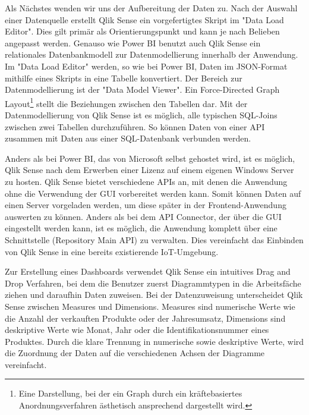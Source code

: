 Als Nächstes wenden wir uns der Aufbereitung der Daten zu. Nach der Auswahl einer Datenquelle
erstellt Qlik Sense ein vorgefertigtes Skript im "Data Load Editor". Dies gilt primär als Orientierungspunkt
und kann je nach Belieben angepasst werden. Genauso wie Power BI benutzt auch Qlik Sense ein relationales
Datenbankmodell zur Datenmodellierung innerhalb der Anwendung. Im "Data Load Editor"
werden, so wie bei Power BI, Daten im JSON-Format mithilfe eines Skripts in eine Tabelle konvertiert.
Der Bereich zur Datenmodellierung ist der "Data Model Viewer". Ein Force-Directed Graph Layout\footnote{Eine Darstellung,
bei der ein Graph durch ein kräftebasiertes Anordnungsverfahren ästhetisch ansprechend dargestellt wird.\cite{ForceDirectedGraphLayout}} stellt die
Beziehungen zwischen den Tabellen dar. Mit der Datenmodellierung von Qlik Sense ist es möglich, alle typischen SQL-Joins
zwischen zwei Tabellen durchzuführen. So können Daten von einer API zusammen mit Daten aus einer SQL-Datenbank
verbunden werden.

Anders als bei Power BI, das von Microsoft selbst gehostet wird, ist es möglich, Qlik Sense nach dem Erwerben
einer Lizenz auf einem eigenen Windows Server zu hosten. Qlik Sense bietet verschiedene APIs an,
mit denen die Anwendung ohne die Verwendung der GUI vorbereitet werden kann. Somit können Daten
auf einen Server vorgeladen werden, um diese später in der Frontend-Anwendung auswerten zu können. Anders als bei
dem API Connector, der über die GUI eingestellt werden kann, ist es möglich, die Anwendung komplett über
eine Schnittstelle (Repository Main API) zu verwalten.\cite{QlikSenseRepositoryMainAPI}
Dies vereinfacht das Einbinden von Qlik Sense in eine bereits existierende IoT-Umgebung.

Zur Erstellung eines Dashboards verwendet Qlik Sense ein intuitives Drag and Drop Verfahren,
bei dem die Benutzer zuerst Diagrammtypen in die Arbeitsfäche ziehen und
daraufhin Daten zuweisen. Bei der Datenzuweisung unterscheidet Qlik Sense zwischen Measures und
Dimensions. Measures sind numerische Werte wie die Anzahl der verkauften Produkte oder der Jahresumsatz,
Dimensions sind deskriptive Werte wie Monat, Jahr oder die Identifikationsnummer eines Produktes.\cite{TutorialsSpotMeasuresDimensions}
Durch die klare Trennung in numerische sowie deskriptive Werte, wird die Zuordnung der Daten
auf die verschiedenen Achsen der Diagramme vereinfacht.

